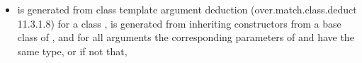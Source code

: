 \begin{adjustwidth}{0.5cm}{0.5cm}
\begin{addedblock}
\begin{itemize}
\item {} is generated from class template argument deduction (over.match.class.deduct 11.3.1.8) for a class ,  is generated from inheriting constructors from a base class of , and for all arguments the corresponding parameters of  and  have the same type, or if not that,
\end{itemize}
\end{addedblock}
\end{adjustwidth}


\renewcommand{\bibname}{References}



